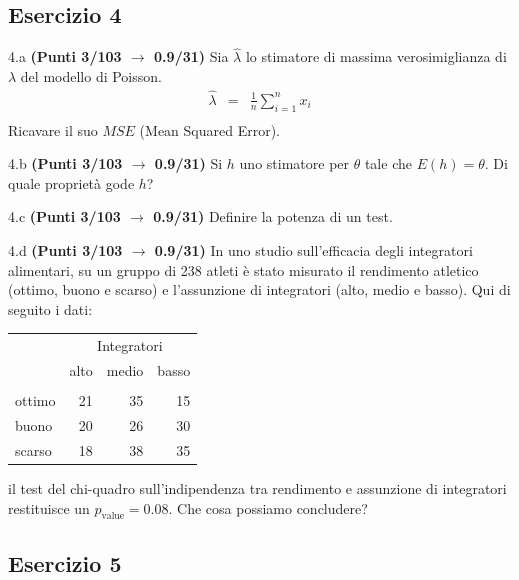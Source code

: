 \documentclass[
  11pt,
]{book}
\theoremstyle{mytheoremstyle}
\theoremstyle{mydefstyle}
\begin{document}
\subsection{Esercizio 4}\label{esercizio-4-19}

4.a \textbf{(Punti 3/103 \(\rightarrow\) 0.9/31)} Sia \(\hat \lambda\) lo stimatore di massima verosimiglianza di \(\lambda\) del modello di Poisson.
\begin{eqnarray*}
  \hat\lambda &=&  \frac 1n\sum_{i=1}^nx_i\\
\end{eqnarray*}
Ricavare il suo \(MSE\) (Mean Squared Error).

4.b \textbf{(Punti 3/103 \(\rightarrow\) 0.9/31)} Si \(h\) uno stimatore per \(\theta\) tale che \(E(h)=\theta\). Di quale proprietà gode \(h\)?

4.c \textbf{(Punti 3/103 \(\rightarrow\) 0.9/31)} Definire la potenza di un test.

4.d \textbf{(Punti 3/103 \(\rightarrow\) 0.9/31)} In uno studio sull'efficacia degli integratori alimentari, su un gruppo di 238 atleti è stato misurato il rendimento atletico (ottimo, buono e scarso) e l'assunzione di integratori (alto, medio e basso). Qui di seguito i dati:

\begin{table}[H]
\centering\centering
\begin{tabular}{lrrr}
\toprule
\multicolumn{1}{c}{ } & \multicolumn{3}{c}{Integratori} \\
\cmidrule(l{3pt}r{3pt}){2-4}
  & alto & medio & basso\\
\midrule
\addlinespace[0.3em]
\multicolumn{4}{l}{\textbf{rendimento}}\\
\hspace{1em}ottimo & 21 & 35 & 15\\
\hspace{1em}buono & 20 & 26 & 30\\
\hspace{1em}scarso & 18 & 38 & 35\\
\bottomrule
\end{tabular}
\end{table}

il test del chi-quadro sull'indipendenza tra rendimento e assunzione di integratori restituisce un \(p_\text{value}=0.08\). Che cosa possiamo concludere?

\subsection{Esercizio 5}\label{esercizio-5-17}
\end{document}
